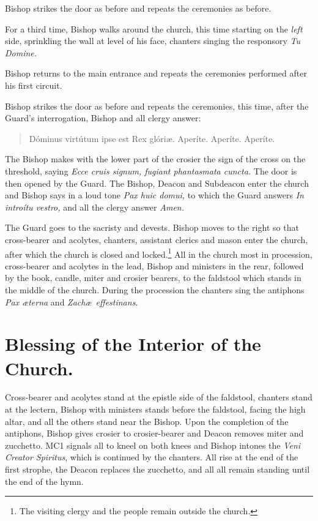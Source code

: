 \documentclass[letterpaper]{report}
\begin{document}
{\rubric Bishop strikes the door as before and repeats the ceremonies as before.

\rubric For a third time, Bishop walks around the church, this time starting on the
\textit{left} side, sprinkling the wall at level of his face, chanters singing
the responsory \textit{Tu Domine.}

\rubric Bishop returns to the main entrance and repeats the ceremonies performed
after his first circuit.

\rubric Bishop strikes the door as before and repeats the ceremonies, this
time, after the Guard's interrogation, Bishop and all clergy answer:

\begin{quote}
    Dóminus virtútum ipse est Rex glóri\ae. Aperíte. Aperíte. Aperíte.
\end{quote}

\rubric The Bishop makes with the lower part of the crosier the sign of the
cross on the threshold, saying \textit{Ecce cru\cross is signum, fugiant
phantasmata cuncta.} The door is then opened by the Guard. The Bishop, Deacon
and Subdeacon enter the church and Bishop says in a loud tone \textit{Pax huic
domui,} to which the Guard answers \textit{In introítu vestro,} and all the
clergy answer \textit{Amen.}

\rubric The Guard goes to the sacristy and devests. Bishop moves to the right
so that cross-bearer and acolytes, chanters, assistant clerics and mason enter
the church, after which the church is closed and locked.\footnote{The visiting
clergy and the people remain outside the church.} All in the church most in
procession, cross-bearer and acolytes in the lead, Bishop and ministers in the
rear, followed by the book, candle, miter and crosier bearers, to the faldstool
which stands in the middle of the church. During the procession the chanters
sing the antiphons \textit{Pax \ae terna} and \textit{Zach\ae\ effestinans.}

\section{Blessing of the Interior of the Church.}

\rubric Cross-bearer and acolytes stand at the epistle side of the faldstool,
chanters stand at the lectern, Bishop with ministers stands before the
faldstool, facing the high altar, and all the others stand near the Bishop.
Upon the completion of the antiphons, Bishop gives crosier to crosier-bearer
and Deacon removes miter and zucchetto. MC1 signals all to kneel on both knees
and Bishop intones the \textit{Veni Creator Spiritus}, which is continued by
the chanters. All rise at the end of the first strophe, the Deacon replaces the
zucchetto, and all all remain standing until the end of the hymn.

}
\end{document}

